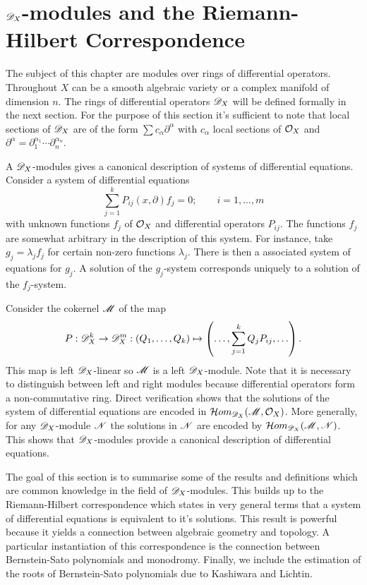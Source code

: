 \chapter{$\mathscr{D}_X$-modules and the Riemann-Hilbert Correspondence}\label{Ch: ChapterDX}
The subject of this chapter are modules over rings of differential operators.
Throughout $X$ can be a smooth algebraic variety or a complex manifold of dimension $n$.
The rings of differential operators $\mathscr{D}_X$ will be defined formally in the next section.
For the purpose of this section it's sufficient to note that local sections of $\mathscr{D}_X$ are of the form $\sum c_{\alpha } \partial^\alpha$ with $c_{\alpha}$ local sections of $\mathcal{O}_X$ and $\partial^\alpha = \partial_1^{\alpha_1}\cdots \partial_n^{\alpha_n}$.

A $\mathscr{D}_X$-modules gives a canonical description of systems of differential equations.
Consider a system of differential equations
$$\sum_{j=1}^k P_{ij}(x,\partial) f_j = 0; \qquad i= 1,\ldots,m$$
with unknown functions $f_j$ of $\mathcal{O}_X$ and differential operators $P_{ij}$.
The functions $f_j$ are somewhat arbitrary in the description of this system.
For instance, take $g_j=\lambda_j f_j$ for certain non-zero functions $\lambda_j$.
There is then a associated system of equations for $g_j$.
A solution of the $g_j$-system corresponds uniquely to a solution of the $f_j$-system.

Consider the cokernel $\mathscr{M}$ of the map
$$P:\mathscr{D}_X^k \to \mathscr{D}_X^m : \left(Q_1,\ldots, Q_k\right) \mapsto \left(\ldots, \sum_{j=1}^k Q_j P_{ij},\ldots\right).$$
This map is left $\mathscr{D}_X$-linear so $\mathscr{M}$ is a left $\mathscr{D}_X$-module.
Note that it is necessary to distinguish between left and right modules because differential operators form a non-commutative ring.
Direct verification shows that the solutions of the system of differential equations are encoded in $\mathcal{H}om_{\mathscr{D}_X}(\mathscr{M},\mathcal{O}_X)$.
More generally, for any $\mathscr{D}_X$-module $\mathscr{N}$ the solutions in $\mathscr{N}$ are encoded by $\mathcal{H}om_{\mathscr{D}_X}(\mathscr{M},\mathscr{N})$.
This shows that $\mathscr{D}_X$-modules provide a canonical description of differential equations.

The goal of this section is to summarise some of the results and definitions which are common knowledge in the field of $\mathscr{D}_X$-modules.
This builds up to the Riemann-Hilbert correspondence which states in very general terms that a system of differential equations is equivalent to it's solutions.
This result is powerful because it yields a connection between algebraic geometry and topology.
A particular instantiation of this correspondence is the connection between Bernstein-Sato polynomials and monodromy.
Finally, we include the estimation of the roots of Bernstein-Sato polynomials due to Kashiwara and Lichtin.

